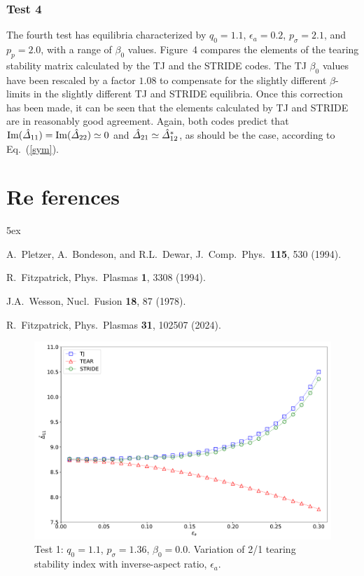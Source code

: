 \documentclass[12pt,prb,aps,notitlepage]{revtex4-1}
\begin{document}
\subsubsection{Test 4}
The fourth test has equilibria characterized by $q_0=1.1$, $\epsilon_a=0.2$, $p_\sigma = 2.1$, and $p_p=2.0$, with a range of $\beta_0$ values.  
Figure~4 compares the elements of the tearing stability matrix calculated by the TJ and the STRIDE codes. The TJ $\beta_0$ values have been rescaled
by a factor $1.08$ to compensate for the slightly different $\beta$-limits in the slightly different TJ and STRIDE equilibria. 
 Once this correction has been made, it can be seen that the elements calculated by
TJ and STRIDE are in reasonably good agreement.  Again, both codes predict that  ${\rm Im}(\hat{\mit\Delta}_{11})={\rm Im}(\hat{\mit\Delta}_{22}) \simeq 0$ and $\hat{\mit\Delta}_{21}\simeq \hat{\mit\Delta}_{12}^\ast$, as should be the case, according to Eq.~(\ref{sym}).


\section*{Re
ferences}
\begin{thebibliography}{99}\baselineskip 5ex

 A.~Pletzer, A.~Bondeson, and R.L.~Dewar, J.\ Comp.\ Phys.\ {\bf 115}, 530 (1994).

 R.~Fitzpatrick, Phys.\ Plasmas {\bf 1}, 3308 (1994). 

 J.A.~Wesson, Nucl.\ Fusion {\bf 18},  87 (1978). 

 R.~Fitzpatrick, Phys.\ Plasmas {\bf 31}, 102507 (2024).

\end{thebibliography}

\newpage
\begin{figure}
\centerline{\includegraphics[width=\textwidth]{Test1.pdf}}
\caption{Test 1: $q_0=1.1$, $p_\sigma=1.36$, $\beta_0=0.0$. Variation of 2/1 tearing stability index with inverse-aspect ratio, $\epsilon_a$. }
\end{figure}
\end{document}
